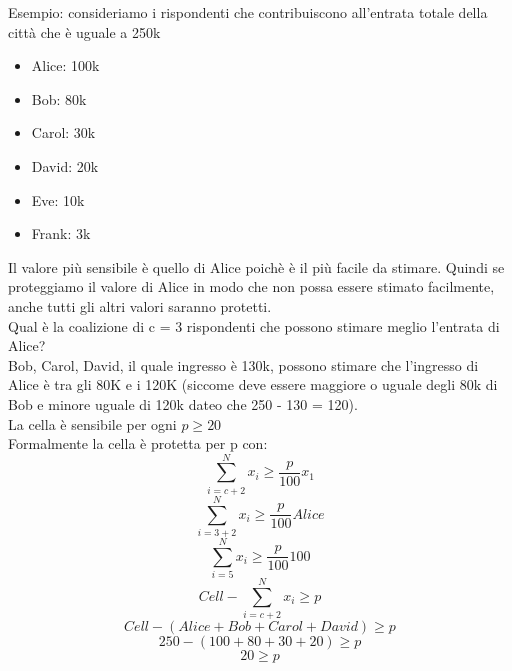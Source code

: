 Esempio: consideriamo i rispondenti che contribuiscono all'entrata totale della città che è uguale a 250k
\begin{itemize}
    \item Alice: 100k
    \item Bob: 80k
    \item Carol: 30k
    \item David: 20k
    \item Eve: 10k
    \item Frank: 3k
\end{itemize}
Il valore più sensibile è quello di Alice poichè è il più facile da stimare. Quindi se proteggiamo il valore di Alice in modo che non possa essere stimato facilmente, anche tutti gli altri valori saranno protetti.\\
Qual è la coalizione di c = 3 rispondenti che possono stimare meglio l'entrata di Alice?\\
Bob, Carol, David, il quale ingresso è 130k, possono stimare che l'ingresso di Alice è tra gli 80K e i 120K (siccome deve essere maggiore o uguale degli 80k di Bob e minore uguale di 120k dateo che 250 - 130 = 120).\\
La cella è sensibile per ogni \(p \geq 20\) \\
Formalmente la cella è protetta per p con:
\[\sum_{i=c+2}^N x_i \geq \frac{p}{100}x_1\]
\[\sum_{i=3+2}^N x_i \geq \frac{p}{100}Alice\]
\[\sum_{i=5}^N x_i \geq \frac{p}{100}100\]
\[Cell - \sum_{i=c+2}^N x_i \geq p \]
\[Cell - (Alice + Bob + Carol + David) \geq p \]
\[250 - (100 + 80 + 30 + 20) \geq p \]
\[20 \geq p \]

